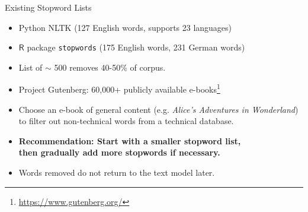 \documentclass{beamer}
\renewcommand{\cite}{\citep}
\begin{document}

\begin{frame}{Existing Stopword Lists}
\begin{itemize}
\item Python NLTK (127 English words, supports 23 languages)
\item $\mathsf{R}$ package \texttt{stopwords} (175 English words, 231 German words)
\item List of $\sim$ 500 removes 40-50\% of corpus.~\cite{schofield2017pulling}
	\bigskip
\item Project Gutenberg: 60,000+ publicly available e-books\footnote{\url{https://www.gutenberg.org/}}
\item Choose an e-book of general content (e.g. \textit{Alice's Adventures in Wonderland}) to filter out non-technical words from a technical database.~\cite{brooke2015gutentag}
	\bigskip
\item \textbf{Recommendation: Start with a smaller stopword list,\\
	then gradually add more stopwords if necessary.}
\item Words removed do not return to the text model later.
\end{itemize}
\end{frame}



\end{document}
